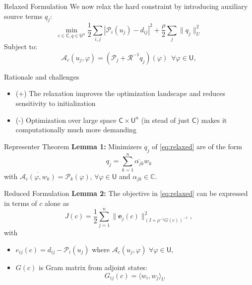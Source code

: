 \documentclass{beamer}
\newcommand{\sU}{\mathsf{U}}
\newcommand{\sC}{\mathsf{C}}
\newcommand{\mA}{\mathcal{A}}
\newcommand{\mP}{\mathcal{P}}
\newcommand{\mR}{\mathcal{R}}
\begin{document}
\begin{frame}{Relaxed Formulation}
We now relax the hard constraint by introducing auxiliary source terms $q_j$:
\begin{equation}
  \label{eq:relaxed}
\min_{c\in\sC, q\in\sU^n} \frac{1}{2} \sum_{i,j} |\mP_i(u_j) - d_{ij}|^2 + \frac{\rho}{2} \sum_j \|q_j\|_U^2
\end{equation}
Subject to:
\begin{equation*}
\mA_c(u_j, \varphi) = (\mP_j + \mR^{-1}q_j)(\varphi) \,\,\, \forall \varphi \in \sU,
\end{equation*}
\end{frame}

\begin{frame}{Rationale and challenges}
\begin{itemize}
  \item (+) The relaxation improves the optimization landscape and reduces sensitivity to initialization
  \item (-) Optimization over large space $\sC \times \sU^n$ (in stead of just $\sC$) makes it computationally much more demanding
\end{itemize}
\end{frame}

\begin{frame}{Representer Theorem}
\textbf{Lemma 1:} Minimizers $q_j$ of \eqref{eq:relaxed} are of the form
\begin{equation*}
q_j = \sum_{k=1}^n \overline{\alpha_{jk}} w_k
\end{equation*}
with $\overline{\mA_c(\varphi, w_k)} = \mP_k(\varphi),\, \forall \varphi\in\sU$ and $\alpha_{jk}\in\mathbb{C}$.
\end{frame}

\begin{frame}{Reduced Formulation}
\textbf{Lemma 2:}
The objective in \eqref{eq:relaxed} can be expressed in terms of $c$ alone as 
\begin{equation*}
J(c) = \frac{1}{2} \sum_{j=1}^n \|\mathbf{e}_j(c)\|_{(I + \rho^{-1} G(c))^{-1}}^2,
\end{equation*}
with
\begin{itemize}
  \item $e_{ij}(c) = d_{ij}-\mP_i(u_j)$ where $\mA_c(u_j,\varphi)\,\, \forall \varphi\in\sU$,
  \item $G(c)$ is Gram matrix from adjoint states:
\begin{equation*}
G_{ij}(c) = \langle w_i, w_j \rangle_U
\end{equation*}
\end{itemize}
\end{frame}
\end{document}
